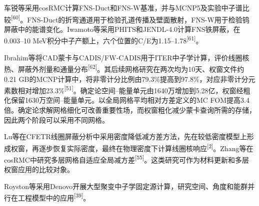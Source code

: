 \documentclass[UTF8, zihao=-4, fontset=none, a4paper]{ctexart}
\newcommand{\upcite}[1]{\textsuperscript{[#1]}}
\begin{document}
车锐等采用cosRMC计算FNS-Duct和FNS-W基准，并与MCNP5及实验中子谱比较\upcite{60}。FNS-Duct的折弯通道用于检验孔道传播及壁面散射，FNS-W用于检验钨屏蔽中的能谱变化。Iwamoto等采用PHITS和JENDL-4.0计算FNS铁屏蔽，在0.003--10 MeV积分中子产额上，六个位置的C/E为1.15--1.78\upcite{61}。

Ibrahim等将CAD蒙卡与CADIS/FW-CADIS用于ITER中子学计算，评价线圈核热、屏蔽外剂量和通量分布\upcite{62}。其后续网格研究在两次均为10天、权窗文件约0.21 GB的MCNP计算中，将非零计分比例由79.3\%提高到97.8\%，对应非零计分元素数相对增加23.3\%\upcite{51}。确定论空间--能量单元由1640万增加到5.28亿，权窗经粗化保留1630万空间--能量单元。以全局网格平均相对方差定义的MC FOM提高3.4倍。确定论求解网格细化可改善重要性场，而权窗粗化减少蒙卡查询所需的存储，因此两个阶段可以采用不同网格。

Lu等在CFETR线圈屏蔽分析中采用密度降低减方差方法，先在较低密度模型上形成权窗，再逐步恢复实际密度，最终在物理密度下计算线圈核响应\upcite{2}。Zhang等在cosRMC中研究多层网格自适应全局减方差\upcite{55}。这类研究可作为材料更新和多层权窗应用的比较对象。

Royston等采用Denovo开展大型聚变中子学固定源计算，研究空间、角度和能群并行在工程模型中的应用\upcite{39}。
\end{document}
